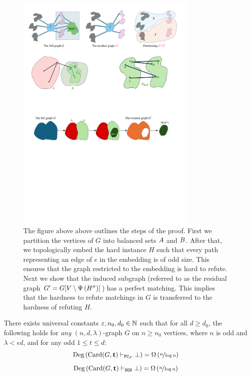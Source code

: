\documentclass[11pt]{article}
\begin{document}
\begin{figure}
  \includegraphics[width=0.8\textwidth]{assets/proof-sketch.pdf}
  \caption{The figure above above outlines the steps of the proof. First we partition the vertices of $G$ into balanced sets $A$ and $B$. After that, we topologically embed the hard instance $H$ such that every path representing an edge of $e$ in the embedding is of odd size. This ensures that the graph restricted to the embedding is hard to refute. Next we show that the induced subgraph (referred to as the residual graph $G' = G[V \setminus \Psi\left({H}^{\sigma}\right)]$) has a perfect matching. This  implies that the hardness to refute matchings in $G$ is transferred to the hardness of refuting $H$.}
	\label{fig:proof-outline}
\end{figure}

\begin{theorem}\label{thm:general-hardness-result}

  There exists universal constants $\varepsilon, n_0, d_0 \in \mathbb{N}$ such that for all $d \geq d_0$, the following holds for \emph{any} $(n, d, \lambda)$-graph $G$ on $n \geq n_0$ vertices, where $n$ is odd and $\lambda < \epsilon d$, and for any odd $1 \leq t \leq d$:  
  \[ \text{Deg}\left(\text{Card}(G, \mathbf{t}) \vdash_{\texttt{PC}_F} \bot\right) = \Omega\left(\nicefrac{n}{\log n}\right)\]
  \[ \text{Deg}\left(\text{Card}(G, \mathbf{t}) \vdash_{\texttt{SOS}} \bot\right) = \Omega\left(\nicefrac{n}{\log n}\right)\]  
\end{theorem}
\end{document}
